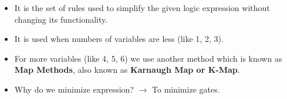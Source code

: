 \documentclass[a4aper,12pt]{report}
\begin{document}
\vspace{1em}
\begin{itemize}
  \item[$\longrightarrow$] It is the set of rules used to simplify the given logic expression without changing its functionality.
  \item[$\longrightarrow$] It is used when numbers of variables are less (like 1, 2, 3).
  \item[$\longrightarrow$] For more variables (like 4, 5, 6) we use another method which is known as \textbf{Map Methods}, also known as \textbf{Karnaugh Map or K-Map}.
\item Why do we minimize expression? $\longrightarrow$ To minimize gates.
  
\end{itemize}
\end{document}
